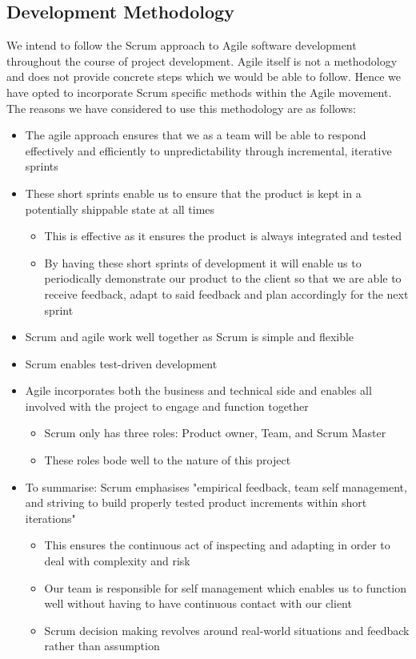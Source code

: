 \documentclass{article}
\begin{document}
	\subsection{Development Methodology}
		We intend to follow the Scrum approach to Agile software development throughout the course of project development. Agile itself is not a methodology and does not provide concrete steps which we would be able to follow. Hence we have opted to incorporate Scrum specific methods within the Agile movement. The reasons we have considered to use this methodology are as follows:
		\begin{itemize}
			\item The agile approach ensures that we as a team will be able to respond effectively and efficiently to unpredictability through incremental, iterative sprints
			\item These short sprints enable us to ensure that the product is kept in a potentially shippable state at all times
			\begin{itemize}
				\item This is effective as it ensures the product is always integrated and tested
				\item By having these short sprints of development it will enable us to periodically demonstrate our product to the client so that we are able to receive feedback, adapt to said feedback and plan accordingly for the next sprint
			\end{itemize}
			\item Scrum and agile work well together as Scrum is simple and flexible
			\item Scrum enables test-driven development
			\item Agile incorporates both the business and technical side and enables all involved with the project to engage and function together
			\begin{itemize}
				\item Scrum only has three roles: Product owner, Team, and Scrum Master
				\item These roles bode well to the nature of this project
			\end{itemize}
			\item To summarise: Scrum emphasises "empirical feedback, team self management, and striving to build properly tested product increments within short iterations"
			\begin{itemize}
				\item This ensures the continuous act of inspecting and adapting in order to deal with complexity and risk
				\item Our team is responsible for self management which enables us to function well without having to have continuous contact with our client
				\item Scrum decision making revolves around real-world situations and feedback rather than assumption
			\end{itemize}
		\end{itemize}
\end{document}
